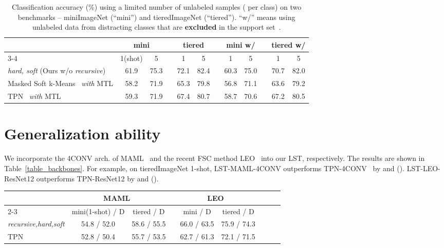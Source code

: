 \documentclass{article}
\begin{document}
\begin{table}[h]
\centering
\small
\begin{tabular}{llccccccccccc}
\toprule 
&& \multicolumn{2}{c}{mini}
&& \multicolumn{2}{c}{tiered} && \multicolumn{2}{c}{mini w/}
&& \multicolumn{2}{c}{tiered w/} \\
\cmidrule{3-4}\cmidrule{6-7} \cmidrule{9-10}\cmidrule{12-13}
&& 1(shot) & 5 && 1 & 5 && 1 & 5 && 1 & 5 \\
\midrule[1pt]
\multicolumn{2}{l}{\emph{hard, soft} (Ours w/o \emph{recursive})} & 61.9 & 75.3 && 72.1 & 82.4  && 60.3 & 75.0  && 70.7 & 82.0  \\
\midrule[1pt]
\multicolumn{2}{l}{Masked Soft k-Means~\cite{RenICLR2018_semisupervised} \emph{with} MTL} & 58.2 & 71.9  && 65.3 & 79.8 && 56.8 & 71.1 && 63.6 & 79.2  \\
\multicolumn{2}{l}{TPN~\cite{LiuICLR2019transductive} \emph{with} MTL} & 59.3 & 71.9  && 67.4 & 80.7  && 58.7 & 70.6 &&  67.2 & 80.5  \\
\bottomrule[1pt]
\end{tabular}
\vspace{0.1cm}
\caption{Classification accuracy (\%) using a limited number of unlabeled samples ( per class) on two benchmarks -- miniImageNet (``mini'') and tieredImageNet (``tiered''). ``w/'' means using unlabeled data from distracting classes that are \textbf{excluded} in the support set~\cite{RenICLR2018_semisupervised, LiuICLR2019transductive}.}
\label{table_fewer_un}
\end{table} 

\section{Generalization ability}
\label{sec_different_backbones}
We incorporate the 4CONV arch. of MAML~\cite{FinnAL17} and the recent FSC method LEO~\cite{RusuICLR2019} into our LST, respectively. The results are shown in Table~\ref{table_backbones}. For example, on tieredImageNet 1-shot, LST-MAML-4CONV outperforms TPN-4CONV~\cite{LiuICLR2019transductive} by  and  (). LST-LEO-ResNet12 outperforms TPN-ResNet12 by  and  ().

\begin{table*}[h]
\centering
\begin{tabular}{lcccccccc}
\toprule 
& \multicolumn{2}{c}{MAML~\cite{FinnAL17}}
&& \multicolumn{2}{c}{LEO~\cite{RusuICLR2019}}\\
\cmidrule{2-3}\cmidrule{5-6}
& mini(1-shot) / D & tiered / D  && mini / D & tiered / D\\
\midrule[1pt]
\midrule[1pt]
\emph{recursive,hard,soft} & 54.8 / 52.0 & 58.6 / 55.5  && 66.0 / 63.5  & 75.9 / 74.3 \\
TPN~\cite{LiuICLR2019transductive} & 52.8 / 50.4  & 55.7 / 53.5 && 62.7 / 61.3 &  72.1 / 71.5\\
\bottomrule[1pt]
\end{tabular}
\vspace{-0.15cm}
\caption{5-way, 1-shot classification accuracy () by replacing our base network MTL(ResNet-12)~\cite{SunCVPR2019} with MAML(4CONV)~\cite{FinnAL17} and LEO(ResNet-12)~\cite{RusuICLR2019}.}
\label{table_backbones}
\end{table*}  
\end{document}
